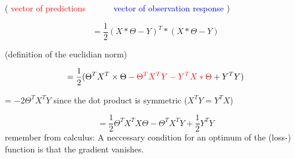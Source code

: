 \begin{center}
( \textcolor{red}{vector of predictions}$\quad\quad\quad$ \textcolor{blue}{vector of observation response} )
\end{center}
\[ = \frac{1}{2} (X * \Theta -Y)^T * (X * \Theta - Y)\]
\begin{center}
(definition of the euclidian norm)
\end{center}
\[ = \frac{1}{2} (\Theta^T X^T \times \Theta - \textcolor{red}{\Theta^T X^T Y - Y^T X*\Theta} + Y^T Y)\]
\begin{center}
= $-2 \Theta^T X^T Y$ since the dot product is symmetric ($X^T Y = Y^T X$)
\end{center}
\[= \frac{1}{2} \Theta^T X^T X \Theta - \Theta^T X^T Y + \frac{1}{2} Y^T Y\]
remember from calculus: A neccessary condition for an optimum of the (loss-) function is that the gradient vanishes.\\

